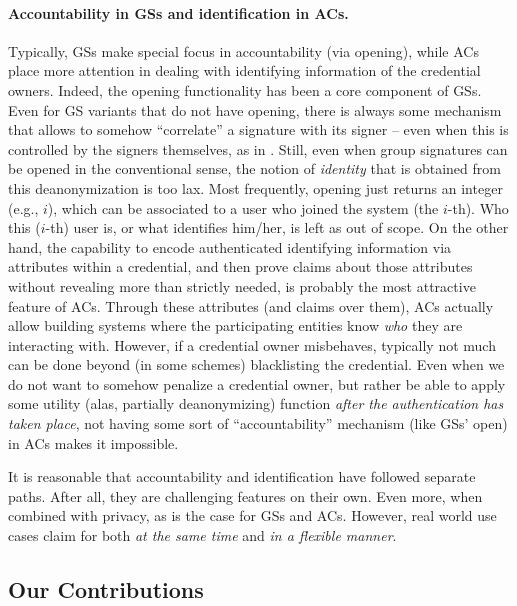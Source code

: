\paragraph{Accountability in GSs and identification in ACs.} %
Typically, GSs make special focus in accountability (via opening), while ACs
place more attention in dealing with identifying information of the credential
owners.
%
Indeed, the opening functionality has been a core component of GSs. Even for
GS variants that do not have opening, there is always some mechanism that
allows to somehow ``correlate'' a signature with its signer -- even when this is
controlled by the signers themselves, as in \cite{dl21} \needcite. Still, even
when group signatures can be opened in the conventional sense, the notion of
\emph{identity} that is obtained from this deanonymization is too lax. Most
frequently, opening just returns an integer (e.g., $i$), which can
be associated to a user who joined the system (the $i$-th). Who this ($i$-th)
user is, or what identifies him/her, is left as out of scope.
%
On the other hand, the capability to encode authenticated identifying
information via attributes within a credential, and then prove claims about
those attributes without revealing more than strictly needed, is probably the
most attractive feature of ACs. Through these attributes (and claims over
them), ACs actually allow building systems where the participating entities
know \emph{who} they are interacting with. However, if a credential owner
misbehaves, typically not much can be done beyond (in some schemes) blacklisting
the credential. Even when we do not want to somehow penalize a credential owner,
but rather be able to apply some utility (alas, partially deanonymizing)
function \emph{after the authentication has taken place}, not having some sort
of ``accountability'' mechanism (like GSs' open) in ACs makes it impossible.

It is reasonable that accountability and identification have followed separate
paths. After all, they are challenging features on their own. Even more, when
combined with privacy, as is the case for GSs and ACs. However, real world use
cases claim for both \emph{at the same time} and \emph{in a flexible manner}.


\subsection{Our Contributions}
\label{ssec:contributions}


